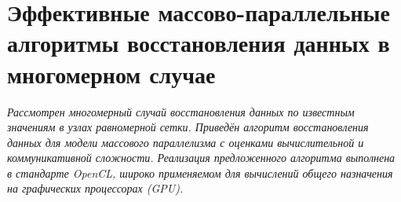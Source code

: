 


\section*{ 
Эффективные массово-параллельные 
алгоритмы восстановления данных в многомерном случае
}

\bigskip

\textit{
  Рассмотрен многомерный случай восстановления данных
  по известным значениям в узлах равномерной сетки. 
  Приведён алгоритм восстановления данных для модели массового параллелизма
  с оценками вычислительной и коммуникативной сложности.
  Реализация предложенного алгоритма выполнена в стандарте OpenCL,
  широко применяемом для вычислений общего назначения на графических процессорах (GPU).
}






